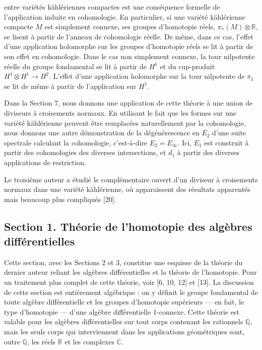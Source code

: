 \documentclass[
  french,
  a3paper,
  a3paper]{extarticle}
\begin{document}
\fontsize{9}{11}\selectfont

entre variétés kählériennes compactes est une conséquence formelle de
l'application induite en cohomologie. En particulier, si une variété
kählérienne compacte \(M\) est simplement connexe, ses groupes
d'homotopie réels, \(\pi_*(M)\otimes\mathbb R\), se lisent à partir de
l'anneau de cohomologie réelle. De même, dans ce cas, l'effet d'une
application holomorphe sur les groupes d'homotopie réels se lit à partir
de son effet en cohomologie. Dans le cas non simplement connexe, la tour
nilpotente réelle du groupe fondamental se lit à partir de \(H^1\) et du
cup-produit \(H^1\otimes H^1\to H^2\). L'effet d'une application
holomorphe sur la tour nilpotente de \(\pi_1\) se lit de même à partir
de l'application sur \(H^1\).

Dans la Section 7, nous donnons une application de cette théorie à une
union de diviseurs à croisements normaux. En utilisant le fait que les
formes sur une variété kählérienne peuvent être remplacées naturellement
par la cohomologie, nous donnons une autre démonstration de la
dégénérescence en \(E_2\) d'une suite spectrale calculant la
cohomologie, c'est-à-dire \(E_2=E_\infty\). Ici, \(E_1\) est construit à
partir des cohomologies des diverses intersections, et \(d_1\) à partir
des diverses applications de restriction.

Le troisième auteur a étudié le complémentaire ouvert d'un diviseur à
croisements normaux dans une variété kählérienne, où apparaissent des
résultats apparentés mais beaucoup plus compliqués {[}20{]}.

\subsection{Section 1. Théorie de l'homotopie des algèbres
différentielles}\label{section-1.-thuxe9orie-de-lhomotopie-des-alguxe8bres-diffuxe9rentielles}

Cette section, avec les Sections 2 et 3, constitue une esquisse de la
théorie du dernier auteur reliant les algèbres différentielles et la
théorie de l'homotopie. Pour un traitement plus complet de cette
théorie, voir {[}6, 10, 12{]} et {[}13{]}. La discussion de cette
section est entièrement algébrique : on y définit le groupe fondamental
de toute algèbre différentielle et les groupes d'homotopie supérieurs
--- en fait, le type d'homotopie --- d'une algèbre différentielle
1-connexe. Cette théorie est valable pour les algèbres différentielles
sur tout corps contenant les rationnels \(\mathbb Q\), mais les seuls
corps qui interviennent dans les applications géométriques sont, outre
\(\mathbb Q\), les réels \(\mathbb R\) et les complexes \(\mathbb C\).
\end{document}
